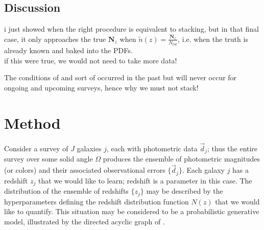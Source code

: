 
\subsection{Discussion}

i just showed when the right procedure is equivalent to stacking, but in that final case, it only approaches the true $\textbf{N}_{z}$ when $\tilde{n}(z) = \frac{\textbf{N}_{z}}{N_{tot}}$, i.e. when the truth is already known and baked into the PDFs.\\
if this were true, we would not need to take more data!

The conditions of  and  sort of occurred in the past but will never occur for ongoing and upcoming surveys, hence why we must not stack!

\section{Method}


Consider a survey of $J$ galaxies $j$, each with photometric data $\vec{d}_{j}$; thus the entire survey over some solid angle $\Omega$ produces the ensemble of photometric magnitudes (or colors) and their associated observational errors $\{\vec{d}_{j}\}$.  
Each galaxy $j$ has a redshift $z_{j}$ that we would like to learn; redshift is a parameter in this case.  
The distribution of the ensemble of redshifts $\{z_{j}\}$ may be described by the hyperparameters defining the redshift distribution function $N(z)$ that we would like to quantify.  
This situation may be considered to be a probabilistic generative model, illustrated by the directed acyclic graph of .  

